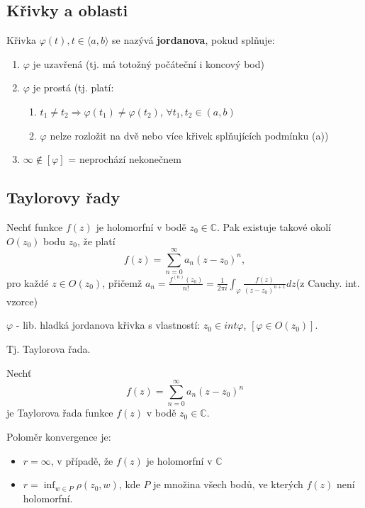 \subsection{Křivky a oblasti}
\begin{definition}
Křivka $\varphi(t), t\in\langle a,b\rangle$ se nazývá \textbf{jordanova}, pokud splňuje:
\begin{enumerate}
\item $\varphi$ je uzavřená (tj. má totožný počáteční i koncový bod)
\item $\varphi$ je prostá (tj. platí: 
\begin{enumerate}
\item $t_1\neq t_2 \Rightarrow\varphi(t_1)\neq\varphi(t_2)$, $\forall t_1,t_2\in(a,b)$
\item $\varphi$ nelze rozložit na dvě nebo více křivek splňujících podmínku (a))
\end{enumerate}
\item $\infty\notin[\varphi]$ = neprochází nekonečnem
\end{enumerate}
\end{definition}

\subsection{Taylorovy řady}
\begin{theorem}[Taylorova]
Nechť funkce $f(z)$ je holomorfní v bodě $z_0\in\mathbb{C}$. Pak  existuje takové okolí $O(z_0)$ bodu $z_0$, že platí $$f(z)=\sum_{n=0}^\infty a_n(z-z_0)^n,$$ pro každé  $ z\in O(z_0)$, přičemž  $a_n=\frac{f^{(n)}(z_0)}{n!}=\frac{1}{2\pi i}\int_{\varphi}\frac{f(z)}{(z-z_0)^{n+1}}dz$(z Cauchy. int. vzorce)

$\varphi$ - lib. hladká jordanova křivka s vlastností: $z_0\in int\varphi$, $[\varphi\in O(z_0)]$.

Tj. Taylorova řada.
\end{theorem}

\begin{theorem}
Nechť $$f(z)=\sum_{n=0}^{\infty}a_n(z-z_0)^n$$ je Taylorova řada funkce $f(z)$ v bodě $z_0\in\mathbb{C}$. 

Poloměr konvergence je: 
\begin{itemize}
\item $r=\infty$, v případě, že $f(z)$ je holomorfní v $\mathbb{C}$
\item $r=\inf_{w\in P}\rho(z_0,w)$, kde $P$ je množina všech bodů, ve kterých $f(z)$ není holomorfní.
\end{itemize}
\end{theorem}


